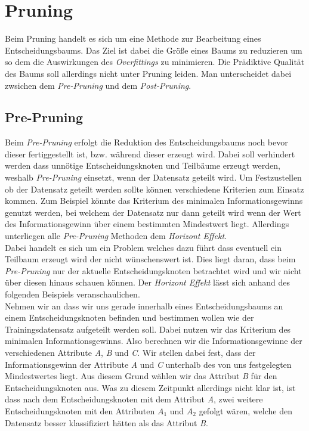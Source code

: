 \chapter{Pruning}
\label{pruning}
Beim Pruning handelt es sich um eine Methode zur Bearbeitung eines Entscheidungsbaums. Das Ziel ist dabei die Größe eines Baums zu reduzieren um so dem die Auswirkungen des \textit{Overfittings} zu minimieren. Die Prädiktive Qualität des Baums soll allerdings nicht unter Pruning leiden. \autocites{WikiPruning:online}{DataMining} Man unterscheidet dabei zwsichen dem \textit{Pre-Pruning} und dem \textit{Post-Pruning}. \autocite{DataMining}

\section{Pre-Pruning}
\label{pre-pruning}
Beim \textit{Pre-Pruning} erfolgt die Reduktion des Entscheidungsbaums noch bevor dieser fertiggestellt ist, bzw. während dieser erzeugt wird. Dabei soll verhindert werden dass unnötige Entscheidungsknoten und Teilbäume erzeugt werden, weshalb \textit{Pre-Pruning} einsetzt, wenn der Datensatz geteilt wird. Um Festzustellen ob der Datensatz geteilt werden sollte können verschiedene Kriterien zum Einsatz kommen. Zum Beispiel könnte das Kriterium des minimalen Informationsgewinns genutzt werden, bei welchem der Datensatz nur dann geteilt wird wenn der Wert des Informationsgewinn über einem bestimmten Mindestwert liegt. \autocite{DataMining} Allerdings unterliegen alle \textit{Pre-Pruning} Methoden dem \textit{Horizont Effekt}. \autocite{WikiPruning:online}\\
Dabei handelt es sich um ein Problem welches dazu führt dass eventuell ein Teilbaum erzeugt wird der nicht wünschenswert ist. Dies liegt daran, dass beim \textit{Pre-Pruning} nur der aktuelle Entscheidungsknoten betrachtet wird und wir nicht über diesen hinaus schauen können. \autocites{HorizonProblem}{WikiPruning:online} Der \textit{Horizont Effekt} lässt sich anhand des folgenden Beispiels veranschaulichen.\\
Nehmen wir an dass wir uns gerade innerhalb eines Entscheidungsbaums an einem Entscheidungsknoten befinden und bestimmen wollen wie der Trainingsdatensatz aufgeteilt werden soll. Dabei nutzen wir das Kriterium des minimalen Informationsgewinns. Also berechnen wir die Informationsgewinne der verschiedenen Attribute \textit{A}, \textit{B} und \textit{C}. Wir stellen dabei fest, dass der Informationsgewinn der Attribute \textit{A} und \textit{C} unterhalb des von uns festgelegten Mindestwertes liegt. Aus diesem Grund wählen wir das Attribut \textit{B} für den Entscheidungsknoten aus. Was zu diesem Zeitpunkt allerdings nicht klar ist, ist dass nach dem Entscheidungsknoten mit dem Attribut \textit{A}, zwei weitere Entscheidungsknoten mit den Attributen $A_{1}$ und $A_{2}$ gefolgt wären, welche den Datensatz besser klassifiziert hätten als das Attribut \textit{B}.\\

